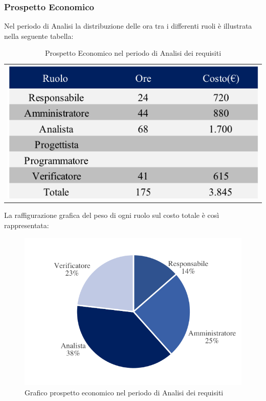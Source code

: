 \newpage
\subsubsection{Prospetto Economico}
Nel periodo di Analisi la distribuzione delle ora tra i differenti ruoli è illustrata nella seguente tabella:

\begin{table}[!ht]
	\begin{center}
	\begin{tabular}{c}
	\includegraphics{images/tabellaProspettoEconomico.png}
    \end{tabular}
	\caption{Prospetto Economico nel periodo di Analisi dei requisiti}
	\end{center}
\end{table}

La raffigurazione grafica del peso di ogni ruolo sul costo totale è così rappresentata:

\begin{figure}[!ht]
	\centering
	\includegraphics{images/grafoProspettoEconomico.png}
	\caption{Grafico prospetto economico nel periodo di Analisi dei requisiti }
\end{figure}

